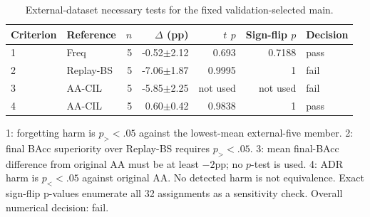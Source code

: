 \begin{table}[t]
\centering\scriptsize
\setlength{\tabcolsep}{3.3pt}
\caption{External-dataset necessary tests for the fixed validation-selected main.}\label{tab:compact-cse-tests}
\begin{tabular}{llrrrrl}
\toprule
Criterion & Reference & $n$ & $\Delta$ (pp) & $t$ $p$ & Sign-flip $p$ & Decision \\
\midrule
1 & Freq & 5 & -0.52$\pm$2.12 & 0.693 & 0.7188 & pass \\
2 & Replay-BS & 5 & -7.06$\pm$1.87 & 0.9995 & 1 & fail \\
3 & AA-CIL & 5 & -5.85$\pm$2.25 & not used & not used & fail \\
4 & AA-CIL & 5 & 0.60$\pm$0.42 & 0.9838 & 1 & pass \\
\bottomrule
\end{tabular}
\par\smallskip\begin{minipage}{0.98\textwidth}\scriptsize 1: forgetting harm is $p_{>}<.05$ against the lowest-mean external-five member. 2: final BAcc superiority over Replay-BS requires $p_{>}<.05$. 3: mean final-BAcc difference from original AA must be at least $-2$pp; no $p$-test is used. 4: ADR harm is $p_{<}<.05$ against original AA. No detected harm is not equivalence. Exact sign-flip p-values enumerate all 32 assignments as a sensitivity check. Overall numerical decision: fail.\end{minipage}
\end{table}
